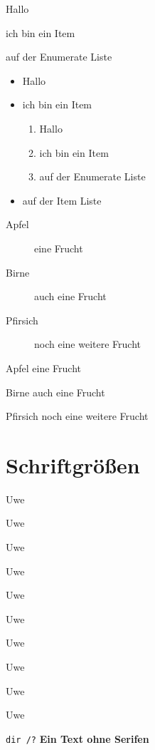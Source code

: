 \documentclass[ngerman,12pt,parskip=half]{scrreprt}
\begin{document}
\begin{compactenum}[i]
\item Hallo
\item ich bin ein Item
\item auf der Enumerate Liste
\end{compactenum}


\begin{itemize}
\item Hallo
\item ich bin ein Item
\begin{enumerate}
\item Hallo
\item ich bin ein Item
\item auf der Enumerate Liste
\end{enumerate}

\item auf der Item Liste
\end{itemize}


\begin{description}
\item[Apfel] eine Frucht
\item[Birne] auch eine Frucht
\item[Pfirsich] noch eine weitere Frucht
\end{description}

\begin{compactdesc}
\item[Apfel] eine Frucht
\item[Birne] auch eine Frucht
\item[Pfirsich] noch eine weitere Frucht
\end{compactdesc}

\section{Schriftgrößen}

{\tiny Uwe}

{\scriptsize Uwe} 

{\footnotesize Uwe} 

{\small Uwe} 

{\normalsize Uwe} 

{\large Uwe} 

{\Large Uwe} 

{\LARGE Uwe} 

{\huge Uwe} 

{\Huge Uwe} 

\texttt{dir /?} \textsf{\bfseries Ein Text ohne Serifen}
\end{document}
